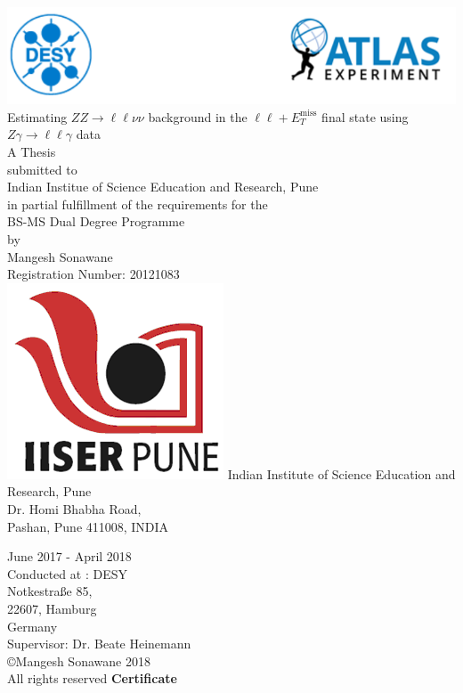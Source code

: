 \documentclass[12pt,a4paper,openright,twoside]{report}
\newcommand{\ZZ}{$ZZ\to \ell\ell\nu\nu$ }
\newcommand{\Zg}{$Z\gamma\to \ell\ell\gamma$ }
\newcommand{\llM}{$\ell\ell+E_T^{\mathrm{miss}}$ }
\begin{document}
\begin{titlepage}
\pagestyle{plain}
\centering
\includegraphics[width=0.9\linewidth]{Title_Head.png}
\vfill
{\Huge Estimating \ZZ background in the \llM final state using \Zg data\\\vspace{1cm}\Large A Thesis \\}
\vspace{1cm}
{\Large submitted to\\Indian Institue of Science Education and Research, Pune\\ in partial fulfillment of the requirements for the \\BS-MS Dual Degree Programme\vspace{1cm}\\by\vspace{1cm}\\Mangesh Sonawane\vspace{0.2cm}\\Registration Number: 20121083\\}
\vspace{1cm}
\includegraphics[scale=0.8]{iiser_logo.png}
\vfill
{\Large Indian Institute of Science Education and Research, Pune\vspace{0.1cm}\\Dr. Homi Bhabha Road,\vspace{0.3cm}\\ Pashan, Pune 411008, INDIA}
\vfill
\vfill
\end{titlepage}
\pagestyle{empty}
\begin{center}
{\large June 2017 - April 2018\\}
\vspace{10cm}
\large 
Conducted at : DESY\\
Notkestra\ss e 85,\\
22607, Hamburg\\
Germany\\
\vspace{10cm}
Supervisor: Dr. Beate Heinemann\\
\copyright Mangesh Sonawane 2018\\
All rights reserved
\vfill
\newpage
\Huge \textbf{Certificate\\}
\end{center}
\end{document}
